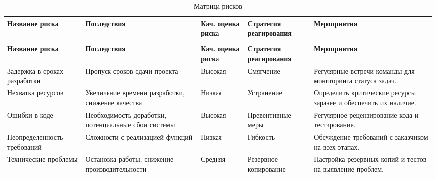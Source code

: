 \begin{longtable}{|p{3.2cm}|p{3.5cm}|p{1.5cm}|p{2.5cm}|p{4cm}|}
	\caption{Матрица рисков} \label{table:risk:matrix} \\
	\hline
	\textbf{Название риска}
	& \textbf{Последствия}
	& \textbf{Кач. оценка риска}
	& \textbf{Стратегия реагирования}
	& \textbf{Мероприятия} \\ 
	\hline
	\endfirsthead
	\conttable{table:risk:matrix} \\
	\hline
	\textbf{Название риска}
	& \textbf{Последствия}
	& \textbf{Кач. оценка риска}
	& \textbf{Стратегия реагирования}
	& \textbf{Мероприятия} \\
	\hline
	\endhead
	Задержка в сроках разработки
		& Пропуск сроков сдачи проекта
		& Высокая
		& Смягчение
		& Регулярные встречи команды для мониторинга статуса задач. \\ \hline
	Нехватка ресурсов
		& Увеличение времени разработки, снижение качества
		& Низкая
		& Устранение
		& Определить критические ресурсы заранее
			и обеспечить их наличие. \\ \hline
	Ошибки в коде
		& Необходимость доработки, потенциальные сбои системы
		& Высокая
		& Превентивные меры
		& Регулярное рецензирование кода и тестирование. \\ \hline
	Неопределенность требований
		& Сложности с реализацией функций
		& Низкая
		& Гибкость
		& Обсуждение требований с заказчиком на всех этапах. \\ \hline
	Технические проблемы
		& Остановка работы, снижение производительности
		& Средняя
		& Резервное копирование
		& Настройка резервных копий и тестов на выявление проблем. \\ \hline
\end{longtable}

